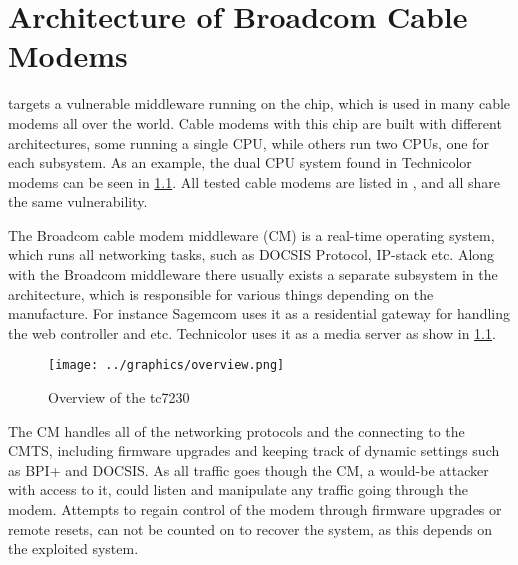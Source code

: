 \chapter{Architecture of Broadcom Cable Modems}
\label{cha:architecture}
\exploitname{} targets a vulnerable middleware running on the chip, which is used in many cable modems all over the world.
Cable modems with this chip are built with different architectures, some running a single CPU, while others run two CPUs, one for each subsystem.
As an example, the dual CPU system found in Technicolor modems can be seen in \cref{fig:overview}.
All tested cable modems are listed in , and all share the same vulnerability.

The Broadcom cable modem middleware (CM) is a real-time operating system, which runs all networking tasks, such as DOCSIS Protocol, IP-stack etc.
Along with the Broadcom middleware there usually exists a separate subsystem in the architecture, which is responsible for various things depending on the manufacture.
For instance Sagemcom uses it as a residential gateway for handling the web controller and etc. Technicolor uses it as a media server as show in \cref{fig:overview}.


\begin{figure}[h]
  \texttt{[image: ../graphics/overview.png]}
  \caption{Overview of the tc7230}
  \label{fig:overview}
\end{figure}

The CM handles all of the networking protocols and the connecting to the CMTS, including firmware upgrades and keeping track of dynamic settings such as BPI+ and DOCSIS.
As all traffic goes though the CM, a would-be attacker with access to it, could listen and manipulate any traffic going through the modem.
Attempts to regain control of the modem through firmware upgrades or remote resets, can not be counted on to recover the system, as this depends on the exploited system.

